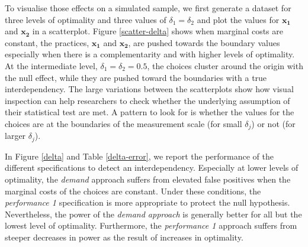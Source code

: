 \documentclass[12pt]{article}
\begin{document}
To visualise those effects on a simulated sample, we first generate a
dataset for three levels of optimality and three values of
\(\delta_1 = \delta_2\) and plot the values for \(\mathbf{x_1}\) and
\(\mathbf{x_2}\) in a scatterplot. Figure \ref{scatter-delta} shows when
marginal costs are constant, the practices, \(\mathbf{x_1}\) and
\(\mathbf{x_2}\), are pushed towards the boundary values especially when
there is a complementarity and with higher levels of optimality. At the
intermediate level, \(\delta_1 = \delta_2 = 0.5\), the choices cluster
around the origin with the null effect, while they are pushed toward the
boundaries with a true interdependency. The large variations between the
scatterplots show how visual inspection can help researchers to check
whether the underlying assumption of their statistical test are met. A
pattern to look for is whether the values for the choices are at the
boundaries of the measurement scale (for small \(\delta_j\)) or not (for
larger \(\delta_j\)).

In Figure \ref{delta} and Table \ref{delta-error}, we report the
performance of the different specifications to detect an
interdependency. Especially at lower levels of optimality, the
\emph{demand} approach suffers from elevated false positives when the
marginal costs of the choices are constant. Under these conditions, the
\emph{performance 1} specification is more appropriate to protect the
null hypothesis. Nevertheless, the power of the \emph{demand approach}
is generally better for all but the lowest level of optimality.
Furthermore, the \emph{performance 1} approach suffers from steeper
decreases in power as the result of increases in optimality.
\end{document}
